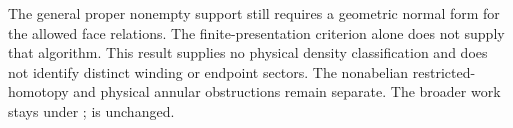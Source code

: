 \documentclass{article}
\begin{document}
The general proper nonempty support still requires a geometric normal form
for the allowed face relations. The finite-presentation criterion alone
does not supply that algorithm. This result supplies no physical density
classification and does not identify distinct winding or endpoint sectors.
The nonabelian restricted-homotopy and physical annular obstructions remain
separate. The broader work stays under ;  is unchanged.



\end{document}

